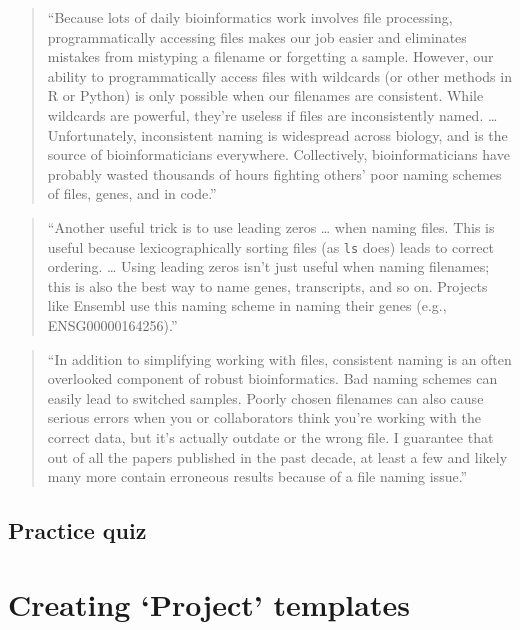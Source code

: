 \documentclass[]{tufte-book}
\begin{document}
\begin{quote}
``Because lots of daily bioinformatics work involves file processing, programmatically
accessing files makes our job easier and eliminates mistakes from mistyping a filename
or forgetting a sample. However, our ability to programmatically access files with
wildcards (or other methods in R or Python) is only possible when our filenames are
consistent. While wildcards are powerful, they're useless if files are inconsistently
named. \ldots{} Unfortunately, inconsistent naming is widespread across biology, and is
the source of bioinformaticians everywhere. Collectively, bioinformaticians have
probably wasted thousands of hours fighting others' poor naming schemes of files,
genes, and in code.'' \citep{buffalo2015bioinformatics}
\end{quote}

\begin{quote}
``Another useful trick is to use leading zeros \ldots{} when naming files. This is useful
because lexicographically sorting files (as \texttt{ls} does) leads to correct ordering. \ldots{}
Using leading zeros isn't just useful when naming filenames; this is also the best
way to name genes, transcripts, and so on. Projects like Ensembl use this naming
scheme in naming their genes (e.g., ENSG00000164256).'' \citep{buffalo2015bioinformatics}
\end{quote}

\begin{quote}
``In addition to simplifying working with files, consistent naming is an often overlooked
component of robust bioinformatics. Bad naming schemes can easily lead to switched samples.
Poorly chosen filenames can also cause serious errors when you or collaborators think you're
working with the correct data, but it's actually outdate or the wrong file. I guarantee
that out of all the papers published in the past decade, at least a few and likely many
more contain erroneous results because of a file naming issue.'' \citep{buffalo2015bioinformatics}
\end{quote}

\hypertarget{practice-quiz}{%
\subsection{Practice quiz}\label{practice-quiz}}

\hypertarget{creating-project-templates}{%
\section{Creating `Project' templates}\label{creating-project-templates}}
\end{document}
